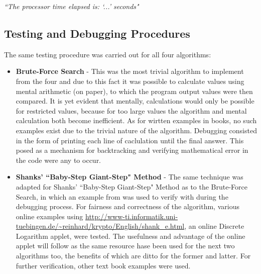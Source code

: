 \documentclass[iwp,first]{luthesis}
\begin{document}
\begin{center}

\textit{``The processor time elapsed is: `...' seconds"}

\end{center}



\subsection{Testing and Debugging Procedures}

The same testing procedure was carried out for all four algorithms:

\begin{itemize}

\item \textbf{Brute-Force Search} - This was the most trivial algorithm to implement from the four and due to this fact it was possible to calculate values using mental arithmetic (on paper), to which the program output values were then compared. It is yet evident that mentally, calculations would only be possible for restricted values, because for too large values the algorithm and mental calculation both become inefficient. As for wirtten examples in books, no such examples exist due to the trivial nature of the algorithm. Debugging consisted in the form of printing each line of caclulation until the final answer. This posed as a mechanism for backtracking and verifying mathematical error in the code were any to occur.

\item \textbf{Shanks' ``Baby-Step Giant-Step" Method} - The same technique was adapted for Shanks' ``Baby-Step Giant-Step" Method as to the Brute-Force Search, in which an example from \cite{HAC} was used to verify with during the debugging process. For fairness and correctness of the algorithm, various online examples using \url{http://www-ti.informatik.uni-tuebingen.de/~reinhard/krypto/English/shank_e.html}, an online Discrete Logarithm applet, were tested. The usefulness and advantage of the online applet will follow as the same resource hase been used for the next two algorithms too, the benefits of which are ditto for the former and latter. For further verification, other text book examples were used.


\end{itemize}
\end{document}
